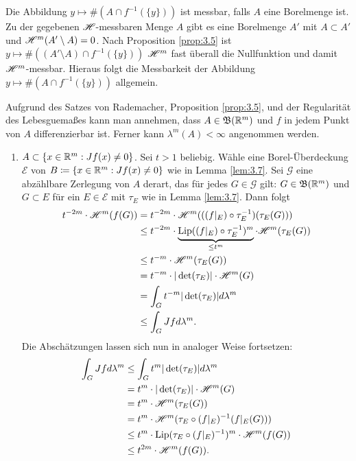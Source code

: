 \documentclass[a4paper,twoside,DIV15,BCOR12mm]{scrbook}
\newcommand{\borel}{\mathfrak B}
\newcommand{\HM}{\H}
\DeclareMathOperator{\Lip}{Lip}
\begin{document}
\begin{beweis}
Die Abbildung $y\mapsto \#(A\cap f^{-1}(\{y\}))$ ist messbar, falls $A$ eine Borelmenge ist. Zu der
gegebenen $\HM$-messbaren Menge $A$ gibt es eine Borelmenge $A'$ mit $A\subset A'$ und $\HM^m(A'\setminus A)=0$. 
Nach Proposition \ref{prop:3.5} ist $y\mapsto \#((A'\setminus A)\cap f^{-1}(\{y\}))$ 
$\HM^m$ fast überall die Nullfunktion und damit $\HM^m$-messbar. Hieraus folgt die Messbarkeit 
der Abbildung $y\mapsto \#(A\cap f^{-1}(\{y\}))$ allgemein. 


Aufgrund des Satzes von Rademacher, Proposition \ref{prop:3.5}, und der Regularität des Lebesguemaßes kann man annehmen, dass $A\in\borel(\MdR^m)$ und $f$ in jedem Punkt von $A$ differenzierbar ist. Ferner kann $\lambda^m(A) < \infty$ angenommen werden.
\begin{enumerate}[{Fall} (a):]
\item $A\subset \{x\in\mathbb{R}^m: Jf(x)\ne 0\}$. Sei $t>1$ beliebig. Wähle eine Borel-Überdeckung $\mathcal E$ von $B\da \{x\in\MdR^m: Jf(x) \ne 0\}$ wie in Lemma \ref{lem:3.7}. Sei $\mathcal G$ eine abzählbare Zerlegung von $A$ derart, das für jedes $G\in\mathcal G$ gilt: $G\in \borel(\MdR^m)$ und $G\subset E$ für ein $E\in\mathcal E$ mit  $\tau_E$ wie in Lemma \ref{lem:3.7}. Dann folgt
\begin{align*}
t^{-2m}\cdot\HM^m(f(G)) 
&= t^{-2m} \cdot \HM^m( ( (f|_E)\circ\tau_E^{-1}) (\tau_E(G)) ) \\
&\le t^{-2m} \cdot \underbrace{\Lip( (f|_E)\circ\tau_E^{-1})^m}_{\le t^m} \cdot \HM^m(\tau_E(G))\\
&\le t^{-m} \cdot \HM^m(\tau_E(G))\\
&= t^{-m} \cdot |\det(\tau_E)| \cdot \HM^m(G) \\
&=\int_G t^{-m} |\det(\tau_E)| d\lambda^m \\
&\le \int_G Jfd\lambda^m.
\end{align*}
Die Abschätzungen lassen sich nun in analoger Weise fortsetzen:
\begin{align*}
\int_G Jfd\lambda^m
&\le \int_G t^m |\det(\tau_E)| d\lambda^m \\
&= t^m \cdot |\det(\tau_E)| \cdot \HM^m(G) \\
&= t^m \cdot \HM^m(\tau_E(G)) \\
&= t^m \cdot \HM^m(\tau_E \circ (f|_E)^{-1} (f|_E(G))) \\
&\le t^m \cdot \Lip(\tau_E \circ (f|_E)^{-1})^m \cdot \HM^m(f(G)) \\
&\le t^{2m} \cdot \HM^m(f(G)).
\end{align*}

\end{enumerate}
\end{beweis}
\end{document}
